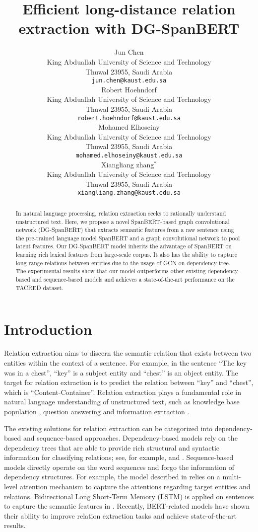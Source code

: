 \documentclass{article}
\title{Efficient long-distance relation extraction with DG-SpanBERT}
\author{
 Jun Chen \\
  King Abduallah University of Science and Technology\\
  Thuwal 23955, Saudi Arabia \\
  \texttt{jun.chen@kaust.edu.sa} \\
\And
  Robert Hoehndorf \\
  King Abduallah University of Science and Technology\\
  Thuwal 23955, Saudi Arabia \\
  \texttt{robert.hoehndorf@kaust.edu.sa} \\
  \And
  Mohamed Elhoseiny \\
  King Abduallah University of Science and Technology\\
  Thuwal 23955, Saudi Arabia \\
  \texttt{mohamed.elhoseiny@kaust.edu.sa} \\
  \And
   Xiangliang zhang$^\ast$ \\
  King Abduallah University of Science and Technology\\
  Thuwal 23955, Saudi Arabia \\
  \texttt{xiangliang.zhang@kaust.edu.sa} \\
}
\begin{document}
\maketitle
\begin{abstract}
In natural language processing, relation extraction seeks to rationally understand unstructured text. Here, we propose a novel SpanBERT-based graph convolutional network (DG-SpanBERT) that extracts semantic features from a raw sentence using the pre-trained language model SpanBERT and a graph convolutional network to pool latent features. Our DG-SpanBERT model inherits the advantage of SpanBERT on learning rich lexical features from large-scale corpus. It also has the ability to capture long-range relations between entities due to the usage of GCN on dependency tree. The experimental results  show that our model outperforms other existing dependency-based and sequence-based models and achieves a state-of-the-art performance on the TACRED dataset.  
\end{abstract}





\section{Introduction}
Relation extraction aims to discern the semantic relation that exists between two entities within the context of a sentence. For example, in the sentence ``The key was in a chest'', ``key'' is a subject entity and ``chest'' is an object entity. The target for relation extraction is to predict the relation between ``key'' and ``chest'', which is ``Content-Container''. Relation extraction plays a fundamental role in natural language understanding of unstructured text, such as knowledge base population \cite{ji2011knowledge}, question answering \cite{yu2017improved} and information extraction \cite{fader2011identifying}.

The existing solutions for relation extraction can be categorized into dependency-based and sequence-based approaches. Dependency-based models rely on the dependency trees that are able to provide rich structural and syntactic information for classifying relations; see, for example, \cite{peng2017cross} and \cite{zhang2018graph}. Sequence-based models directly operate on the word sequences and forgo the information of dependency structures. For example, the model described in \cite{wang2016relation} relies on a multi-level attention mechanism to capture the attentions regarding target entities and relations. Bidirectional Long Short-Term Memory (LSTM) is applied on sentences   to capture the semantic features in \cite{zhou2016attention}. Recently, BERT-related models \cite{joshi2019spanbert,wu2019enriching,soares2019matching} have shown their ability to improve relation extraction tasks and achieve state-of-the-art results.  
\end{document}
